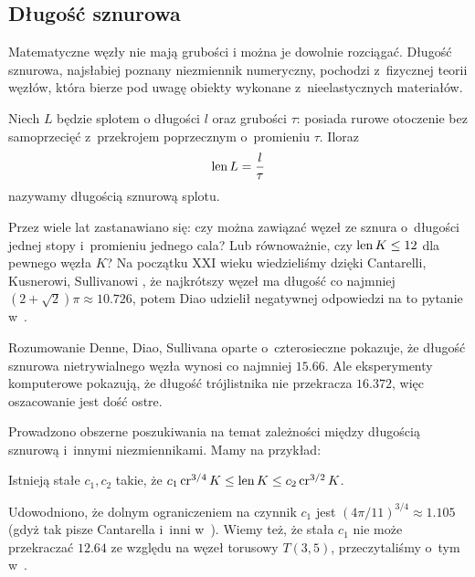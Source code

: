
\subsection{Długość sznurowa}
%
Matematyczne węzły nie mają grubości i można je dowolnie rozciągać.
Długość sznurowa, najsłabiej poznany niezmiennik numeryczny, pochodzi z~fizycznej teorii węzłów, która bierze pod uwagę obiekty wykonane z~nieelastycznych materiałów.

\begin{definition}
    Niech $L$ będzie splotem o długości $l$ oraz grubości $\tau$: posiada rurowe otoczenie bez samoprzecięć z~przekrojem poprzecznym o~promieniu $\tau$.
    Iloraz
    \begin{equation}
        \operatorname{len} L = \frac l \tau
    \end{equation}
    nazywamy długością sznurową splotu.
\end{definition}

Przez wiele lat zastanawiano się: czy można zawiązać węzeł ze sznura o~długości jednej stopy i~promieniu jednego cala?
Lub równoważnie, czy $\operatorname{len} K \le 12$ dla pewnego węzła $K$?
Na początku XXI wieku wiedzieliśmy dzięki Cantarelli, Kusnerowi, Sullivanowi \cite{cantarella02}, że najkrótszy węzeł ma długość co najmniej $(2 + \sqrt 2)\pi \approx 10.726$, potem Diao udzielił negatywnej odpowiedzi na to pytanie w~\cite[s. 14]{diao03}.
%
%
%
%

Rozumowanie Denne, Diao, Sullivana \cite{denne06} oparte o~czterosieczne pokazuje, że długość sznurowa nietrywialnego węzła wynosi co najmniej $15.66$.
Ale eksperymenty komputerowe pokazują, że długość trójlistnika nie przekracza $16.372$, więc oszacowanie jest dość ostre.

Prowadzono obszerne poszukiwania na temat zależności między długością sznurową i~innymi niezmiennikami.
Mamy na przykład:

\begin{proposition}
    Istnieją stałe $c_1, c_2$ takie, że $c_1 \operatorname{cr}^{3/4} K \le \operatorname{len} K \le c_2 \operatorname{cr}^{3/2} K$.
\end{proposition}

Udowodniono, że dolnym ograniczeniem na czynnik $c_1$ jest $(4\pi/11)^{3/4} \approx 1.105$ (gdyż tak pisze Cantarella i~inni w~\cite[tw. 23]{cantarella02}).
Wiemy też, że stała $c_1$ nie może przekraczać $12.64$ ze względu na węzeł torusowy $T(3, 5)$, przeczytaliśmy o~tym w~\cite{klotz21}.

